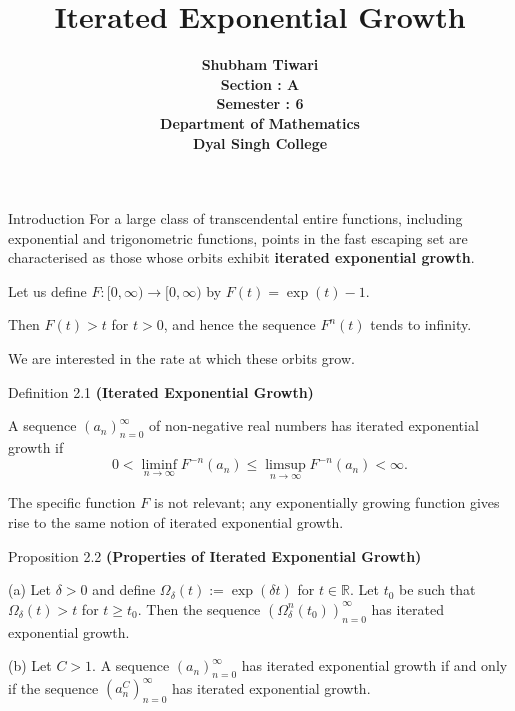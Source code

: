 \documentclass{beamer}
\title{\textbf{Iterated Exponential Growth}}
\author{\textbf{Shubham Tiwari \\ Section : A \\ Semester : 6 \\ Department of Mathematics \\ Dyal Singh College}}
\date{}
\begin{document}
\begin{frame}
\maketitle
\end{frame}

\begin{frame}{Introduction}
For a large class of transcendental entire functions, including exponential and trigonometric functions, points in the fast escaping set are characterised as those whose orbits exhibit \textbf{iterated exponential growth}.

Let us define $F \colon [0,\infty) \to [0,\infty)$ by $F(t) = \exp(t) -1$. 

Then $F(t) > t$ for $t > 0$, and hence the sequence $F^n(t)$ tends to infinity.

We are interested in the rate at which these orbits grow.
\end{frame}

\begin{frame}{Definition 2.1}
\textbf{(Iterated Exponential Growth)} 

A sequence $(a_n)_{n=0}^{\infty}$ of non-negative real numbers has iterated exponential growth if
\[
0 < \liminf_{n \to \infty} F^{-n}(a_n) \leq \limsup_{n \to \infty} F^{-n}(a_n) < \infty.
\]

The specific function $F$ is not relevant; any exponentially growing function gives rise to the same notion of iterated exponential growth.
\end{frame}

\begin{frame}{Proposition 2.2}
\textbf{(Properties of Iterated Exponential Growth)} 

(a) Let $\delta > 0$ and define $\Omega_\delta(t) := \exp(\delta t)$ for $t \in \mathbb{R}$. Let $t_0$ be such that $\Omega_\delta(t) > t$ for $t \geq t_0$. Then the sequence $(\Omega_\delta^n(t_0))_{n=0}^{\infty}$ has iterated exponential growth.

(b) Let $C > 1$. A sequence $(a_n)_{n=0}^{\infty}$ has iterated exponential growth if and only if the sequence $(a_n^C)_{n=0}^{\infty}$ has iterated exponential growth.
\end{frame}
\end{document}
